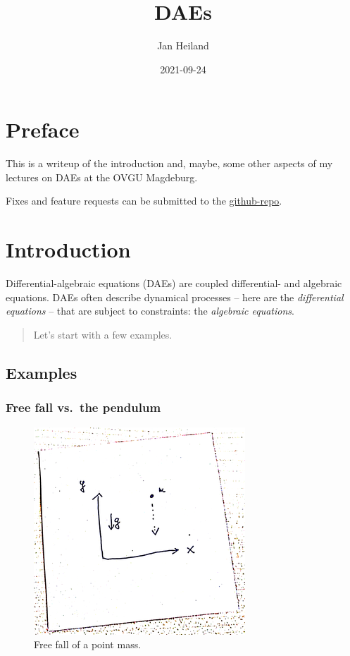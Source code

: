 \documentclass[]{book}
\title{DAEs}
\author{Jan Heiland}
\institute{OVGU/MPI}
\date{2021-09-24}
\newenvironment {JHSAYS} [0] {\begin{quote}\color{jhsc}} {\end{quote}}
\theoremstyle{definition}
\theoremstyle{definition}
\theoremstyle{definition}
\theoremstyle{definition}
\theoremstyle{remark}
\begin{document}
\maketitle

{
\setcounter{tocdepth}{1}
\tableofcontents
}
\hypertarget{preface}{%
\chapter*{Preface}\label{preface}}

This is a writeup of the introduction and, maybe, some other aspects of my lectures on DAEs at the OVGU Magdeburg.

Fixes and feature requests can be submitted to the \href{https://github.com/highlando/script-daes}{github-repo}.

\newcommand{\ind}{\operatorname{ind}}
\newcommand{\rank}{\operatorname{rank}}

\hypertarget{introduction}{%
\chapter{Introduction}\label{introduction}}

Differential-algebraic equations (DAEs) are coupled differential- and algebraic equations. DAEs often describe dynamical processes -- here are the \emph{differential equations} -- that are subject to constraints: the \emph{algebraic equations}.

\begin{JHSAYS}
Let's start with a few examples.
\end{JHSAYS}

\hypertarget{examples}{%
\section{Examples}\label{examples}}

\hypertarget{free-fall-vs.-the-pendulum}{%
\subsection*{Free fall vs.~the pendulum}\label{free-fall-vs.-the-pendulum}}

\begin{figure}

{\centering \includegraphics[width=0.4\linewidth]{pics/freefall} 

}

\caption{Free fall of a point mass.}\label{fig:free-fall}
\end{figure}
\end{document}
